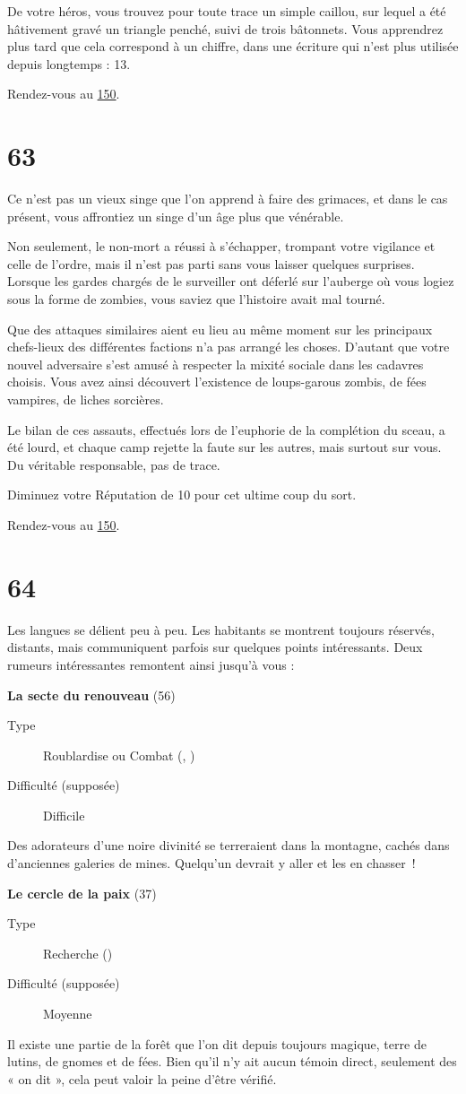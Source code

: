 \documentclass{report}
\newcommand{\gsection}[1]{
    \section{#1}
    \label{section-#1}
}
\newcommand{\glink}[1]{\hyperref[section-#1]{#1}}
\newcommand{\quest}[5]{
    \begin{mdframed}[innertopmargin=0.5cm,innerbottommargin=0.5cm]
        \begin{center}
            \textbf{#1} (#2)
        \end{center}
        \begin{description}
            \item[Type] #3
            \item[Difficulté (supposée)] #4
        \end{description}
        #5
    \end{mdframed}
}
\begin{document}
De votre héros, vous trouvez pour toute trace un simple caillou, sur lequel a été hâtivement gravé un triangle penché, suivi de trois bâtonnets. Vous apprendrez plus tard que cela correspond à un chiffre, dans une écriture qui n'est plus utilisée depuis longtemps : 13.

Rendez-vous au \glink{150}.

\gsection{63}

Ce n'est pas un vieux singe que l'on apprend à faire des grimaces, et dans le cas présent, vous affrontiez un singe d'un âge plus que vénérable.

Non seulement, le non-mort a réussi à s'échapper, trompant votre vigilance et celle de l'ordre, mais il n'est pas parti sans vous laisser quelques surprises. Lorsque les gardes chargés de le surveiller ont déferlé sur l'auberge où vous logiez sous la forme de zombies, vous saviez que l'histoire avait mal tourné.

Que des attaques similaires aient eu lieu au même moment sur les principaux chefs-lieux des différentes factions n'a pas arrangé les choses. D'autant que votre nouvel adversaire s'est amusé à respecter la mixité sociale dans les cadavres choisis. Vous avez ainsi découvert l'existence de loups-garous zombis, de fées vampires, de liches sorcières.

Le bilan de ces assauts, effectués lors de l'euphorie de la complétion du sceau, a été lourd, et chaque camp rejette la faute sur les autres, mais surtout sur vous. Du véritable responsable, pas de trace.

Diminuez votre Réputation de 10 pour cet ultime coup du sort.

Rendez-vous au \glink{150}.

\gsection{64}

Les langues se délient peu à peu. Les habitants se montrent toujours réservés, distants, mais communiquent parfois sur quelques points intéressants. Deux rumeurs intéressantes remontent ainsi jusqu'à vous :

\quest{La secte du renouveau}{56}{Roublardise ou Combat (\ankh, \cross)}{Difficile}{
Des adorateurs d'une noire divinité se terreraient dans la montagne, cachés dans d'anciennes galeries de mines. Quelqu'un devrait y aller et les en chasser !
}

\quest{Le cercle de la paix}{37}{Recherche (\caduceus)}{Moyenne}{
Il existe une partie de la forêt que l'on dit depuis toujours magique, terre de lutins, de gnomes et de fées. Bien qu'il n'y ait aucun témoin direct, seulement des « on dit », cela peut valoir la peine d'être vérifié.
}
\end{document}
